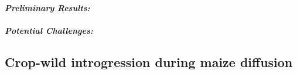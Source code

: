 \paragraph{\emph{Preliminary Results:}} 

\paragraph{\emph{Potential Challenges:}}

\subsection{Crop-wild introgression during maize diffusion} \label{ss:genuswide}


